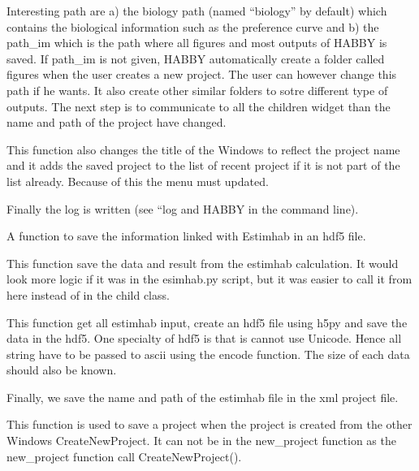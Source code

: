 \documentclass[letterpaper,10pt,english]{sphinxmanual}
\begin{document}
\begin{fulllineitems}
\begin{fulllineitems}
Interesting path are a) the biology path (named ``biology'' by default) which contains the biological information
such as the preference curve and b) the path\_im which is the path where all figures and most outputs of HABBY
is saved. If path\_im is not given, HABBY automatically create a folder called figures when the
user creates a new project. The user can however change this path if he wants. It also create other similar
folders to sotre different type of outputs. The next step is to communicate
to all the children widget than the name and path of the project have changed.

This function also changes the title of the Windows to reflect the project name and it adds the saved
project to the list of recent project if it is not part of the list already. Because of this the menu must
updated.

Finally the log is written (see “log and HABBY in the command line).

\end{fulllineitems}


\begin{fulllineitems}
\label{\detokenize{index:src_GUI.Main_windows_1.MainWindows.save_project_estimhab}}
A function to save the information linked with Estimhab in an hdf5 file.


This function save the data and result from the estimhab calculation. It would look more logic if it was in
the esimhab.py script, but it was easier to call it from here instead of in the child class.

This function get all estimhab input, create an hdf5 file using h5py and save the data in the hdf5. One
specialty of hdf5 is that is cannot use Unicode. Hence all string have to be passed to ascii using the encode
function. The size of each data should also be known.

Finally, we save the name and path of the estimhab file in the xml project file.

\end{fulllineitems}


\begin{fulllineitems}
\label{\detokenize{index:src_GUI.Main_windows_1.MainWindows.save_project_if_new_project}}
This function is used to save a project when the project is created from the other Windows CreateNewProject. It
can not be in the new\_project function as the new\_project function call CreateNewProject().


\end{fulllineitems}
\end{fulllineitems}
\end{document}
